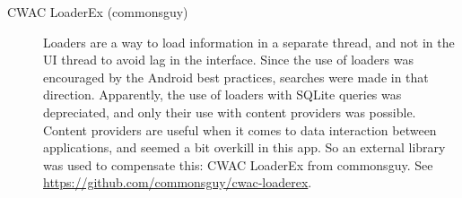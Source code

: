 \begin{description}
\item[CWAC LoaderEx (commonsguy)] Loaders are a way to load information in a separate thread, and not in the UI thread to avoid lag in the interface. Since the use of loaders was encouraged by the Android best practices, searches were made in that direction. Apparently, the use of loaders with SQLite queries was depreciated, and only their use with content providers was possible. Content providers are useful when it comes to data interaction between applications, and seemed a bit overkill in this app. So an external library was used to compensate this: CWAC LoaderEx from commonsguy. See \url{https://github.com/commonsguy/cwac-loaderex}.


\end{description}

